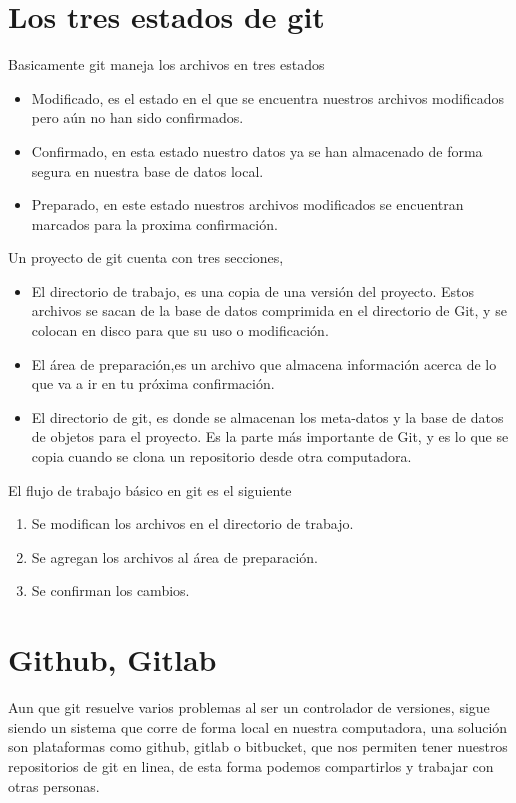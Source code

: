 \documentclass[12pt,a4paper]{article}
\begin{document}
\section*{Los tres estados de git}
Basicamente git maneja los archivos en tres estados
\begin{itemize}
\item Modificado, es el estado en el que se encuentra nuestros archivos modificados pero aún no han sido confirmados.
\item Confirmado, en esta estado nuestro datos ya se han almacenado de forma segura en nuestra base de datos local.
\item Preparado, en este estado nuestros archivos modificados se encuentran marcados para la proxima confirmación.
\end{itemize}
Un proyecto de git cuenta con tres secciones,
\begin{itemize}
\item El directorio de trabajo, es una copia de una versión del proyecto. Estos archivos se sacan de la base de datos comprimida en el directorio de Git, y se colocan en disco para que su uso o modificación.
\item El área de preparación,es un archivo que almacena información acerca de lo que va a ir en tu próxima confirmación.
\item El directorio de git, es donde se almacenan los meta-datos y la base de datos de objetos para el proyecto. Es la parte más importante de Git, y es lo que se copia cuando se clona un repositorio desde otra computadora.

\end{itemize}

El flujo de trabajo básico en git es el siguiente
\begin{enumerate}
\item Se modifican los archivos en el directorio de trabajo.
\item Se agregan los archivos al área de preparación.
\item Se confirman los cambios.
\end{enumerate}

\section*{Github, Gitlab}
Aun que git resuelve varios problemas al ser un controlador de versiones, sigue siendo un sistema que corre de forma local en nuestra computadora, una solución son plataformas como github, gitlab o bitbucket, que nos permiten tener nuestros repositorios de git en linea, de esta forma podemos compartirlos y trabajar con otras personas. 
\end{document}
